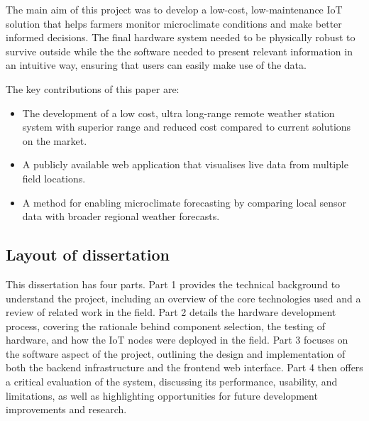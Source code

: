 The main aim of this project was to develop a low-cost, low-maintenance IoT
solution that helps farmers monitor microclimate conditions and make better
informed decisions. The final hardware system needed to be physically robust to
survive outside while the the software needed to present relevant information in
an intuitive way, ensuring that users can easily make use of the data.

The key contributions of this paper are:

\begin{itemize}
    \item The development of a low cost, ultra long-range remote weather station
    system with superior range and reduced cost compared to current solutions on
    the market.
    \item A publicly available web application that visualises live data from
    multiple field locations.
    \item A method for enabling microclimate forecasting by comparing local
    sensor data with broader regional weather forecasts.
\end{itemize}

\subsection{Layout of dissertation}

This dissertation has four parts. Part 1 provides the technical background to
understand the project, including an overview of the core technologies used and
a review of related work in the field. Part 2 details the hardware development
process, covering the rationale behind component selection, the testing of
hardware, and how the IoT nodes were deployed in the field. Part 3 focuses on
the software aspect of the project, outlining the design and implementation of
both the backend infrastructure and the frontend web interface. Part 4 then
offers a critical evaluation of the system, discussing its performance,
usability, and limitations, as well as highlighting opportunities for future
development improvements and research.

